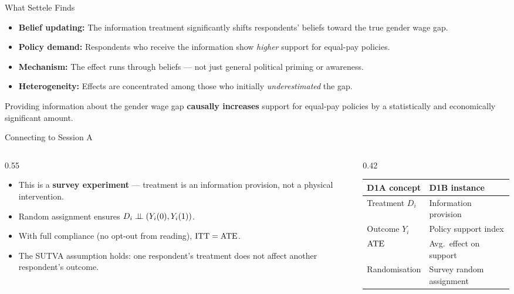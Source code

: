 \documentclass[aspectratio=169, 11pt]{beamer}
\begin{document}
\begin{frame}[t]{What Settele Finds}
\begin{itemize}
  \setlength\itemsep{0.5em}
  \item \textbf{Belief updating:} The information treatment significantly shifts respondents' beliefs toward the true gender wage gap.
  \item \textbf{Policy demand:} Respondents who receive the information show \emph{higher} support for equal-pay policies.
  \item \textbf{Mechanism:} The effect runs through beliefs — not just general political priming or awareness.
  \item \textbf{Heterogeneity:} Effects are concentrated among those who initially \emph{underestimated} the gap.
\end{itemize}
\vspace{0.5em}
\begin{examplebox}
Providing information about the gender wage gap \textbf{causally increases} support for equal-pay policies
by a statistically and economically significant amount.
\end{examplebox}
\end{frame}


\begin{frame}[t]{Connecting to Session A}
\begin{columns}[T]
\begin{column}{0.55\textwidth}
\begin{itemize}
  \setlength\itemsep{0.5em}
  \item This is a \textbf{survey experiment} — treatment is an information provision, not a physical intervention.
  \item Random assignment ensures $D_i \perp\!\!\!\perp (Y_i(0), Y_i(1))$.
  \item With full compliance (no opt-out from reading), $\mathrm{ITT} = \mathrm{ATE}$.
  \item The SUTVA assumption holds: one respondent's treatment does not affect another respondent's outcome.
\end{itemize}
\end{column}
\begin{column}{0.42\textwidth}
\begin{keybox}[From D1A to D1B]
\small
\begin{tabular}{ll}
\toprule
D1A concept & D1B instance \\
\midrule
Treatment $D_i$ & Information provision \\
Outcome $Y_i$ & Policy support index \\
$\mathrm{ATE}$ & Avg.\ effect on support \\
Randomisation & Survey random assignment \\
\bottomrule
\end{tabular}
\end{keybox}
\end{column}
\end{columns}
\end{frame}
\end{document}
